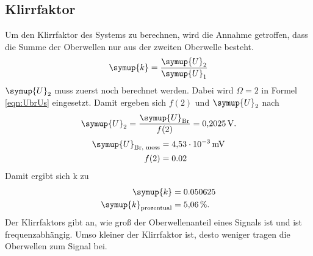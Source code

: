 \newpage
\subsection{Klirrfaktor}
\label{sec:klirr}
Um den Klirrfaktor des Systems zu berechnen, wird die Annahme getroffen, dass die Summe der
Oberwellen nur aus der zweiten Oberwelle besteht.
\begin{equation}
  \symup{k} = \frac{\symup{U}_2}{\symup{U}_1}
\label{eqn:klirr2}
\end{equation}
$\symup{U}_2$ muss zuerst noch berechnet werden.
Dabei wird $\Omega = 2$ in Formel \eqref{eqn:UbrUs}
eingesetzt. Damit ergeben sich $f(2)$ und $\symup{U}_2$ nach
\begin{equation}
  \symup{U}_2 = \frac{\symup{U}_\text{Br}}{f(2)}= \SI{0,2025}{\volt}.
\end{equation}
\begin{align*}
  \symup{U}_\text{Br, mess} &= \SI{4.53e-3}{\milli\volt} \\
  f(2) &= 0.02
\end{align*}
Damit ergibt sich k zu
\begin{align*}
  \symup{k} &= 0.050625 \\
  \symup{k}_\text{prozentual} &= \SI{5.06}{\percent}.
\end{align*}
Der Klirrfaktors gibt an, wie groß der Oberwellenanteil
eines Signals ist und ist frequenzabhängig.
Umso kleiner der Klirrfaktor ist, desto weniger tragen die Oberwellen
zum Signal bei.
